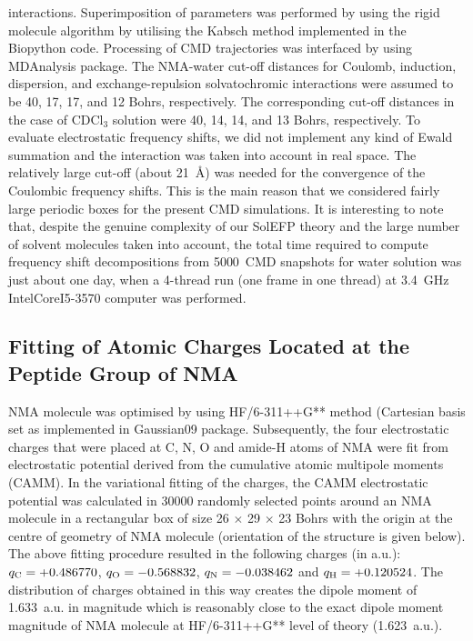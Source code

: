 \documentclass[b5paper,oneside,fleqn,11pt]{book}
\begin{document}
\begin{appendices}
\begin{refsection}
interactions. Superimposition of parameters was performed by
using the rigid molecule algorithm \citep{Blasiak.Lee.Cho.JCP.2013} 
by utilising the Kabsch
method \citep{Kabsch.ActCrystSecA.1976} 
implemented in the {\sc Biopython} code. \citep{Biopython.Bioinformatics.2009}
Processing
of CMD trajectories was interfaced by using {\sc MDAnalysis}
package. \citep{MDAnalysis.JCC.2011} 
The NMA\hyp{}water cut\hyp{}off distances for Coulomb,
induction, dispersion, and exchange\hyp{}repulsion solvatochromic
interactions were assumed to be 40, 17, 17, and 12 Bohrs,
respectively. The corresponding cut\hyp{}off distances in the case of
CDCl$_3$ solution were 40, 14, 14, and 13 Bohrs, respectively. To
evaluate electrostatic frequency shifts, we did not implement
any kind of Ewald summation and the interaction was taken
into account in real space. The relatively large cut\hyp{}off (about
21~\AA) was needed for the convergence of the Coulombic
frequency shifts. This is the main reason that we considered
fairly large periodic boxes for the present CMD simulations. It is
interesting to note that, despite the genuine complexity of our
SolEFP theory and the large number of solvent molecules
taken into account, the total time required to compute
frequency shift decompositions from 5000~CMD snapshots for
water solution was just about one day, when a 4\hyp{}thread run (one
frame in one thread) at 3.4~GHz Intel\textregistered Core\texttrademark I5\hyp{}3570 computer
was performed.

\subsection{Fitting of Atomic Charges Located at the Peptide Group of NMA\label{a:nma-esp-fit}}

NMA molecule was optimised by using HF/6-311++G** method (Cartesian basis set
as implemented in {\sc Gaussian09} package. Subsequently, the four
electrostatic charges that were placed at C, N, O and amide-H atoms of NMA were fit from
electrostatic potential derived from the cumulative atomic multipole moments (CAMM). In
the variational fitting of the charges, the CAMM electrostatic potential was calculated in
30000 randomly selected points around an NMA molecule in a rectangular box of size 
26 $\times$ 29 $\times$ 23 Bohrs with the origin at the centre of geometry of NMA molecule (orientation of the
structure is given below). The above fitting procedure resulted in the following charges (in
a.u.): $q_{\rm C}=+0.486770$, $q_{\rm O}=-0.568832$, $q_{\rm N}=-0.038462$ and 
$q_{\rm H}=+0.120524$. The distribution of
charges obtained in this way creates the dipole moment of 1.633~a.u. in magnitude which is
reasonably close to the exact dipole moment magnitude of NMA molecule at 
HF/6-311++G** level of theory (1.623~a.u.).


\end{refsection}
\end{appendices}
\end{document}
